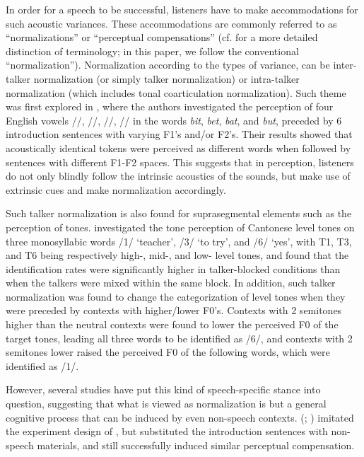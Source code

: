 \documentclass[12pt]{report}
\newcommand{\tip}{\textipa}
\begin{document}
\begin{CJK}{UTF8}{bsmi}
In order for a speech to be successful, listeners have to make accommodations for such acoustic variances. These accommodations are commonly referred to as ``normalizations'' or ``perceptual compensations'' (cf. \cite{Zhangetal2022} for a more detailed distinction of terminology; in this paper, we follow the conventional ``normalization''). Normalization according to the types of variance, can be inter-talker normalization (or simply talker normalization) or intra-talker normalization (which includes tonal coarticulation normalization). Such theme was first explored in \cite{LadefogedBroadbent1957}, where the authors investigated the perception of four English vowels /\tip{I}/, /\tip{E}/, /\tip{5}/, /\tip{2}/ in the words \textit{bit}, \textit{bet}, \textit{bat}, and \textit{but}, preceded by 6 introduction sentences with varying F1's and/or F2's. Their results showed that acoustically identical tokens were perceived as different words when followed by sentences with different F1-F2 spaces. This suggests that in perception, listeners do not only blindly follow the intrinsic acoustics of the sounds, but make use of extrinsic cues and make normalization accordingly.

Such talker normalization is also found for suprasegmental elements such as the perception of tones. \cite{WongDiehl2003} investigated the tone perception of Cantonese level tones on three monosyllabic words /\tip{si}1/ `teacher', /\tip{si}3/ `to try', and /\tip{si}6/ `yes', with T1, T3, and T6 being respectively high-, mid-, and low- level tones, and found that the identification rates were significantly higher in talker-blocked conditions than when the talkers were mixed within the same block. In addition, such talker normalization was found to change the categorization of level tones when they were preceded by contexts with higher/lower F0's. Contexts with 2 semitones higher than the neutral contexts were found to lower the perceived F0 of the target tones, leading all three words to be identified as /\tip{si}6/, and contexts with 2 semitones lower raised the perceived F0 of the following words, which were identified as /\tip{si}1/. 

However, several studies have put this kind of speech-specific stance into question, suggesting that what is viewed as normalization is but a general cognitive process that can be induced by even non-speech contexts. \citeauthor{WatkinsMakin1994} (\citeyear{WatkinsMakin1994}; \citeyear{WatkinsMakin1996}) imitated the experiment design of \cite{LadefogedBroadbent1957}, but substituted the introduction sentences with non-speech materials, and still successfully induced similar perceptual compensation. 


\end{CJK}
\end{document}
